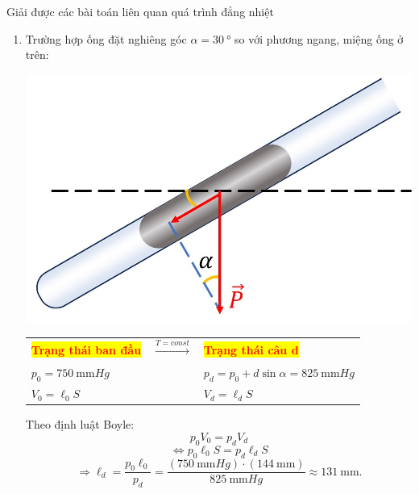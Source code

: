 \begin{dang}{Giải được các bài toán liên quan quá trình đẳng nhiệt}
{{\begin{enumerate}[label=\alph*)]
\begin{minipage}[l]{0.75\textwidth}
\begin{center}
\begin{tabular}{C{4cm} C{1.5cm} C{4.5cm}}
			$p_0=\SI{750}{\milli\meter Hg}$ & &$p_c=p_0-d\sin\alpha=\SI{675}{\milli\meter Hg}$\\
			$V_0=\ell_0S$ & & $V_c=\ell_c S$
		\end{tabular}
	\end{center}
	Theo định luật Boyle:
	$$p_0V_0=p_cV_c$$
	$$\Leftrightarrow p_0\ell_0S=p_c\ell_cS$$
	$$\Rightarrow \ell_c=\dfrac{p_0\ell_0}{p_c}=\dfrac{\left(\SI{750}{\milli\meter Hg}\right)\cdot\left(\SI{144}{\milli\meter}\right)}{\SI{675}{\milli\meter Hg}}=\SI{160}{\milli\meter}.$$
\end{minipage}
\item Trường hợp ống đặt nghiêng góc $\alpha=\SI{30}{\degree}$ so với phương ngang, miệng ống ở trên:\\
\begin{minipage}[l]{0.25\textwidth}
	\begin{center}
		\includegraphics[width=1.0\linewidth]{../figs/VN12-Y24-PH-SYL-010-7}
	\end{center}
\end{minipage}
\begin{minipage}[l]{0.75\textwidth}
	\begin{center}
		\begin{tabular}{C{4cm} C{1.5cm} C{4.5cm}}
			\colorbox{yellow}{\textcolor{red}{\textbf{Trạng thái ban đầu}}} & $\xrightarrow[]{T=const}$ & \colorbox{yellow}{\textcolor{red}{\textbf{Trạng thái câu d}}}\\
			$p_0=\SI{750}{\milli\meter Hg}$ & &$p_d=p_0+d\sin\alpha=\SI{825}{\milli\meter Hg}$\\
			$V_0=\ell_0S$ & & $V_d=\ell_d S$
		\end{tabular}
	\end{center}
	Theo định luật Boyle:
	$$p_0V_0=p_dV_d$$
	$$\Leftrightarrow p_0\ell_0S=p_d\ell_dS$$
	$$\Rightarrow \ell_d=\dfrac{p_0\ell_0}{p_d}=\dfrac{\left(\SI{750}{\milli\meter Hg}\right)\cdot\left(\SI{144}{\milli\meter}\right)}{\SI{825}{\milli\meter Hg}}\approx\SI{131}{\milli\meter}.$$
\end{minipage}
\end{enumerate}
}}
\end{dang}
